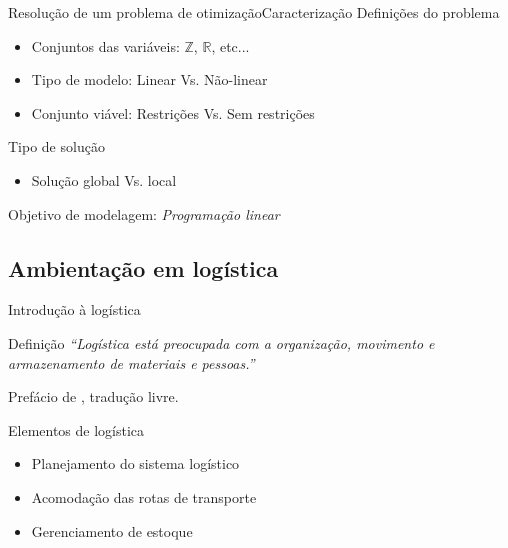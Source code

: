 \documentclass{beamer}
\newenvironment{outeritemize}{\begin{itemize}}{\end{itemize}\vspace{12pt}}
\begin{document}

\begin{frame}{Resolução de um problema de otimização}{Caracterização}
Definições do problema
\begin{outeritemize}    
    \item Conjuntos das variáveis: $\mathbb{Z}$, $\mathbb{R}$, etc...
    \item Tipo de modelo: Linear Vs. Não-linear
    \item Conjunto viável: Restrições Vs. Sem restrições
\end{outeritemize}
Tipo de solução
\begin{outeritemize}    
    \item Solução global Vs. local
\end{outeritemize}
Objetivo de modelagem: \textit{Programação linear}
\end{frame}


\subsection*{Ambientação em logística}

\begin{frame}{Introdução à logística}
    \begin{block}{Definição}
        \textit{``Logística está preocupada com a organização, movimento e armazenamento de materiais e pessoas.''}
        \begin{flushright}
            Prefácio de \cite{ghiani.etal_2004}, tradução livre.
        \end{flushright}
    \end{block}
    \vspace{12pt}
    Elementos de logística
    \begin{itemize}
        \item Planejamento do sistema logístico
        \item Acomodação das rotas de transporte
        \item Gerenciamento de estoque
    \end{itemize}
    
\end{frame}
\end{document}
